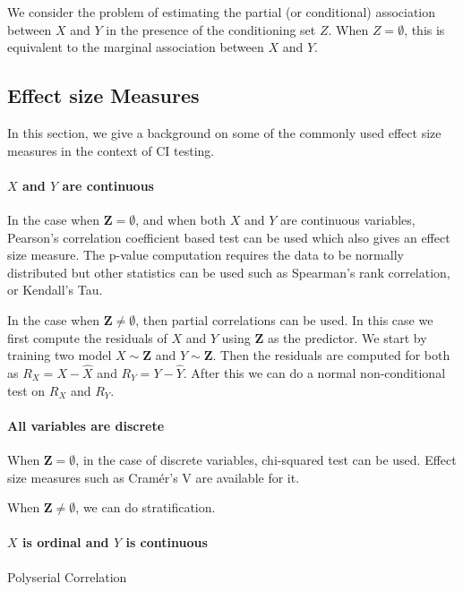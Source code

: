 \documentclass{article}
\begin{document}
We consider the problem of estimating the partial (or conditional) association
between $ X $ and $ Y $ in the presence of the conditioning set $ Z $. When $ Z
= \emptyset $, this is equivalent to the marginal association between $ X $ and
$ Y $.


\subsection{Effect size Measures}
In this section, we give a background on some of the commonly used effect size
measures in the context of CI testing.

\paragraph{$ X $ and $ Y $ are continuous}
In the case when $ \bm{Z} = \emptyset $, and when both $ X $ and $ Y $ are
continuous variables, Pearson's correlation coefficient based test can be used
which also gives an effect size measure. The p-value computation requires the
data to be normally distributed but other statistics can be used such as
Spearman's rank correlation, or Kendall's Tau.

In the case when $ \bm{Z} \neq \emptyset $, then partial correlations can be used.
In this case we first compute the residuals of $ X $ and $ Y $ using $ \bm{Z} $ as 
the predictor. We start by training two model $ X \sim \bm{Z} $ and $ Y \sim \bm{Z} $.
Then the residuals are computed for both as $ R_X = X - \hat{X} $ and $ R_Y = Y - \hat{Y} $.
After this we can do a normal non-conditional test on $ R_X $ and $ R_Y $.

\paragraph{All variables are discrete}

When $ \bm{Z} = \emptyset $, in the case of discrete variables, chi-squared test can be used. Effect size 
measures such as Cram\'er's V are available for it.

When $ \bm{Z} \neq \emptyset $, we can do stratification.


\paragraph{$ X $ is ordinal and $ Y $ is continuous}
Polyserial Correlation
\end{document}
